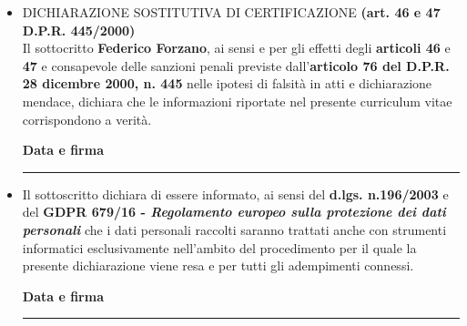 \documentclass[
    italian,
    a4paper,
    nologo,
    notitle
]{europasscv}
\begin{document}
\begin{itemize}
    \item DICHIARAZIONE SOSTITUTIVA DI CERTIFICAZIONE \textbf{(art. 46 e 47 D.P.R. 445/2000)}\\
          Il sottocritto \textbf{Federico Forzano}, ai sensi e per gli effetti degli \textbf{articoli 46} e \textbf{47} e
          consapevole delle sanzioni penali previste dall'\textbf{articolo 76 del D.P.R. 28 dicembre 2000, n. 445} nelle ipotesi di
          falsità in atti e dichiarazione mendace, dichiara che le informazioni riportate nel presente curriculum vitae
          corrispondono a verità.
          \begin{flushright}
              \textbf{Data e firma}\vspace{0.5cm}\\
              \rule{0.3\textwidth}{0.4pt}
          \end{flushright}
    \item Il sottoscritto dichiara di essere informato, ai sensi del \textbf{d.lgs. n.196/2003} e
          del \textbf{GDPR 679/16 - \emph{Regolamento europeo sulla protezione dei dati personali}} che i dati personali raccolti saranno trattati anche
          con strumenti informatici esclusivamente nell'ambito del procedimento per il
          quale la presente dichiarazione viene resa e per tutti gli adempimenti connessi.
          \begin{flushright}
              \textbf{Data e firma}\vspace{0.5cm}\\
              \rule{0.3\textwidth}{0.4pt}
          \end{flushright}
\end{itemize}
\end{document}
